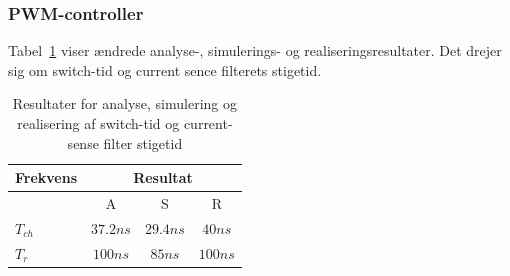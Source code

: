 \subsubsection{PWM-controller}
Tabel~\ref{tab:resultat_klkl} viser ændrede analyse-, simulerings- og realiseringsresultater. Det drejer sig om switch-tid og current sence filterets stigetid.
\begin{table}[H] 			
	\centering
	\begin{tabularx}{\textwidth}{|X|c|c|c|}
		\hline
		\textbf{Frekvens} & \multicolumn{3}{|c|}{\textbf{Resultat}} 		\\ \hline
		& A & S & R 									\\ \hline 
		$T_{ch}$ & $37.2ns$ & $29.4ns$ & $40ns$ 									\\ \hline
		$T_r$ & $100ns$ & $85ns$ & $100ns$					\\  \hline
	\end{tabularx}
	\caption{Resultater for analyse, simulering og realisering af switch-tid og current-sense filter stigetid}
	\label{tab:resultat_klkl}
\end{table}

